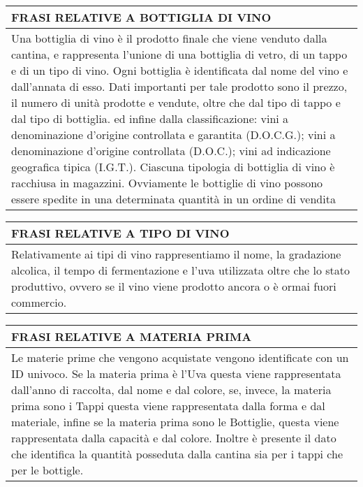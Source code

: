 \begin{center}
	\begin{tabular}{P{16cm}}
		\toprule
		 \textbf {\large {FRASI RELATIVE A BOTTIGLIA DI VINO}} \\
		\midrule
		Una bottiglia di vino è il prodotto finale che viene venduto dalla cantina, e rappresenta l'unione di una bottiglia di vetro, di un tappo e di un tipo di vino. Ogni bottiglia è identificata dal nome del vino e dall'annata di esso. Dati importanti per tale prodotto sono il prezzo, il numero di unità prodotte e vendute, oltre che dal tipo di tappo e dal tipo di bottiglia. ed infine dalla classificazione: vini a denominazione d'origine controllata e garantita (D.O.C.G.); vini a denominazione d'origine controllata (D.O.C.); vini ad indicazione geografica tipica (I.G.T.). Ciascuna tipologia di bottiglia di vino è racchiusa in magazzini. Ovviamente le bottiglie di vino possono essere spedite in una determinata quantità in un ordine di vendita\\
		\bottomrule
	\end{tabular}

	\vspace{0.5cm}
	
	\begin{tabular}{P{16cm}}
		\toprule
		 \textbf {\large {FRASI RELATIVE A TIPO DI VINO}} \\
		\midrule
		Relativamente ai tipi di vino rappresentiamo il nome, la gradazione alcolica, il tempo di fermentazione e l'uva utilizzata oltre che lo stato produttivo, ovvero se il vino viene prodotto ancora o è ormai fuori commercio. \\
		\bottomrule
	\end{tabular}

	\vspace{0.5cm}
	
	\begin{tabular}{P{16cm}}
		\toprule
		 \textbf {\large {FRASI RELATIVE A MATERIA PRIMA}} \\
		\midrule
		Le materie prime che vengono acquistate vengono identificate con un ID univoco. Se la materia prima è l'Uva questa viene rappresentata dall'anno di raccolta, dal nome e dal colore, se, invece, la materia prima sono i Tappi questa viene rappresentata dalla forma e dal materiale, infine se la materia prima sono le Bottiglie, questa viene rappresentata dalla capacità e dal colore. Inoltre è presente il dato che identifica la quantità posseduta dalla cantina sia per i tappi che per le bottigle.\\
		\bottomrule
	\end{tabular}


\end{center}

